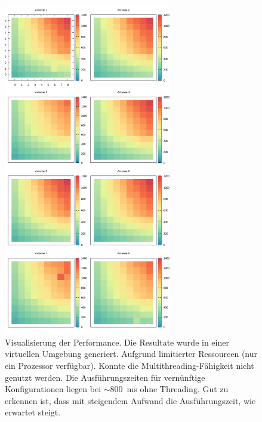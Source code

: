 %
\begin{figure}[!ht]
	\centering
	\caption[Performance Ergebnisse]{ Visualisierung der Performance. Die Resultate wurde in einer virtuellen Umgebung generiert. Aufgrund limitierter Ressourcen (nur ein Prozessor verfügbar). Konnte die Multithreading-Fähigkeit nicht genutzt werden. Die Ausführungszeiten für vernünftige Konfigurationen liegen bei $\sim800$~ms ohne Threading. Gut zu erkennen ist, dass mit steigendem Aufwand die Ausführungszeit, wie erwartet steigt. }
	\label{fig:results6}
	\vspace{3mm}
	\includegraphics[width=0.65\textwidth]{img/resultstiming.png}
\end{figure}
%
